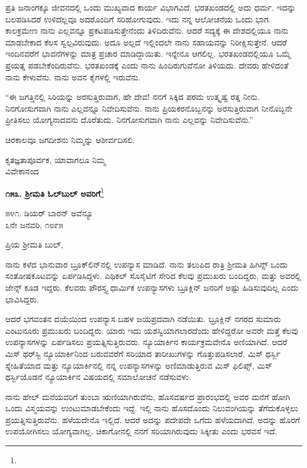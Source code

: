 ಪ್ರತಿ ಜನಾಂಗಕ್ಕೂ ಜೀವನದಲ್ಲಿ ಒಂದು ಮುಖ್ಯವಾದ ಕಾರ್ಯ ವಿಭಾಗವಿದೆ. ಭರತಖಂಡದಲ್ಲಿ ಅದು ಧರ್ಮ. ಇದನ್ನು ಬಲಪಡಿಸಿದರೆ ಉಳಿದೆಲ್ಲವೂ ಅದರೊಂದಿಗೆ ಸರಿಹೋಗುವುದು. ಇದು ನನ್ನ ಆಲೋಚನೆಯ ಒಂದು ಭಾಗ. ಕಾಲಕ್ರಮೇಣ ನಾನು ಎಲ್ಲವನ್ನೂ ಪ್ರಕಟಪಡಿಸುತ್ತೇನೆಂದು ತಿಳಿದಿರುವೆನು. ಆದರೆ ಸದ್ಯಕ್ಕೆ ಈ ದೇಶದಲ್ಲಿಯೂ ನಾನು ಮಾಡಬೇಕಾದ ಕೆಲಸ ಸ್ವಲ್ಪವಿರುವುದು. ಅದೂ ಅಲ್ಲದೆ ಇಲ್ಲಿಂದಲೇ ನಾನು ಸಹಾಯವನ್ನು ನಿರೀಕ್ಷಿಸುತ್ತೇನೆ. ಆದರೆ ಇಂದಿನವರೆಗೆ ಭಾವನೆಗಳನ್ನು ಮಾತ್ರ ಪ್ರಚಾರ ಮಾಡಿದ್ದಾಯಿತು. ಇನ್ನೇನೂ ಆಗಲಿಲ್ಲ. ಭರತಖಂಡದಲ್ಲಿಯೂ ಒಮ್ಮೆ ಪ್ರಯತ್ನ ಪಡಬೇಕೆಂದಿರುವೆನು. ಭರತಖಂಡಕ್ಕೆ ಎಂದು ನಾನು ಹಿಂದಿರುಗುವೆನೋ ತಿಳಿಯದು. ದೇವರು ಹೇಳಿದಂತೆ ನಾನು ಕೇಳುವೆನು. ನಾನು ಅವನ ಕೈಗಳಲ್ಲಿ ಇರುವೆನು.

“ಈ ಜಗತ್ತಿನಲ್ಲಿ ಸಿರಿಯನ್ನು ಅರಸುತ್ತಿರುವಾಗ, ಹೇ ದೇವ! ನನಗೆ ಸಿಕ್ಕಿದ ಪರಮ ಉತ್ಕೃಷ್ಟ ರತ್ನ ನೀನು. ನಿನಗೋಸುಗವಾಗಿ ನಾನು ಎಲ್ಲವನ್ನೂ ನಿವೇದಿಸುವೆನು. ನಾನು ಪ್ರಿಯಕರನೊಬ್ಬನನ್ನು ಅರಸುತ್ತಿರುವಾಗ ನೀನೊಬ್ಬನೇ ಪ್ರೀತಿಸಲು ಯೋಗ್ಯನಾದವನು ದೊರೆತುದು. ನಿನಗೋಸುಗವಾಗಿ ನಾನು ಎಲ್ಲವನ್ನು ನಿವೇದಿಸುವೆನು.”

ಚಿರಕಾಲವೂ ಜಗದೀಶನು ನಿಮ್ಮನ್ನು ಆಶೀರ್ವದಿಸಲಿ.

{\flushright
ಕೃತಜ್ಞತಾಪೂರ್ವಕ, ಯಾವಾಗಲೂ ನಿಮ್ಮ\\ವಿವೇಕಾನಂದ\par}

\begin{center}
\textbf{೧೫೩. ಶ‍್ರೀಮತಿ ಓಲ್‌ಬುಲ್‌ ಅವರಿಗೆ}\footnote{}
\end{center}

\begin{flushright}
೫೪೧. ಡಿಯರ್ ಬಾರನ್ ಅವೆನ್ಯೂ\\೩ನೇ ಜನವರಿ, ೧೮೯೫
\end{flushright}

\noindent
ಪ್ರಿಯ ಶ‍್ರೀಮತಿ ಬುಲ್,

ನಾನು ಕಳೆದ ಭಾನುವಾರ ಬ್ರೂಕ್‌ಲಿನ್‌ನಲ್ಲಿ ಉಪನ್ಯಾಸ ಮಾಡಿದೆ. ನಾನು ತಲುಪಿದ ರಾತ್ರಿ ಶ‍್ರೀಮತಿ ಹಿಗಿನ್ಸ್ ಒಂದು ಸಂತೋಷಕೂಟವನ್ನು ಏರ್ಪಡಿಸಿದ್ದಳು. ಎಥಿಕಲ್ ಸೊಸೈಟಿಗೆ ಸೇರಿದ ಕೆಲವು ಪ್ರಮುಖರು ಬಂದಿದ್ದರು, ಮತ್ತು ಅವರಲ್ಲಿ ಜೇನ್ಸ್ ಕೂಡ ಇದ್ದರು. ಕೆಲವರು ಪೌರಸ್ತ್ಯ ಧಾರ್ಮಿಕ ಉಪನ್ಯಾಸಗಳು ಬ್ರೂಕ್ಲಿನ್ ಜನರಿಗೆ ಅಷ್ಟು ಹಿಡಿಸುವುದಿಲ್ಲ ಎಂದು ಭಾವಿಸಿದ್ದರು.

ಆದರೆ ಭಗವಂತನ ದಯೆಯಿಂದ ಉಪನ್ಯಾಸ ಬಹಳ ಜಯಪ್ರದವಾಗಿ ನಡೆಯಿತು. ಬ್ರೂಕ್ಲಿನ್ ನಗರದ ಸುಮಾರು ಎಂಟುನೂರು ಪ್ರಮುಖರು ಬಂದಿದ್ದರು. ಯಾರು ಇದು ಯಶಸ್ವಿಯಾಗಲಾರದೆಂದು ಹೇಳಿದ್ದರೋ ಅವರೇ ಮತ್ತೆ ಕೆಲವು ಉಪನ್ಯಾಸಗಳನ್ನು ಏರ್ಪಡಿಸಲು ಪ್ರಯತ್ನಿಸುತ್ತಿರುವರು. ನ್ಯೂಯಾರ್ಕಿನ ಕಾರ್ಯಕ್ರಮವೇನೊ ಅಣಿಯಾಗಿದೆ. ಆದರೆ ಮಿಸ್ ಥರ್‌ಸ್ಬಿ ನ್ಯೂಯಾರ್ಕಿನಿಂದ ಬರುವವರೆಗೆ ಸರಿಯಾದ ತಾರೀಖುಗಳನ್ನು ಗೊತ್ತುಪಡಿಸಲಾರೆ. ಮಿಸ್ ಥರ್ಸ್ಬಿ ಸ್ನೇಹಿತೆಯಾದ ಮತ್ತು ನ್ಯೂಯಾರ್ಕಿನಲ್ಲಿ ನನ್ನ ಉಪನ್ಯಾಸಗಳನ್ನು ಅಣಿಮಾಡುತ್ತಿರುವ ಮಿಸ್ ಫಿಲಿಪ್ಸ್, ಮಿಸ್ ಥರ್ಸ್ಬಿಯೊಡನೆ ನ್ಯೂಯಾರ್ಕಿನ ವಿಷಯದಲ್ಲಿ ಸಮಾಲೋಚನೆ ನಡೆಸುವಳು.

ನಾನು ಹೇಲ್ ಮನೆಯವರಿಗೆ ತುಂಬಾ ಋಣಿಯಾಗಿರುವೆನು, ಹೊಸವರ್ಷದ ಪ್ರಾರಂಭದಲ್ಲಿ ಅವರ ಮನೆಗೆ ಹೋಗಿ ಒಂದು ವಿಸ್ಮಯವನ್ನು ಉಂಟುಮಾಡಬೇಕೆಂದು ಇದ್ದೆ. ಇಲ್ಲಿ ನಾನು ಹೊಸದೊಂದು ನಿಲುವಂಗಿಯನ್ನು ತೆಗೆದುಕೊಳ್ಳಲು ಪ್ರಯತ್ನಿಸುತ್ತಿರುವೆನು. ಹಳೆಯದೇನೊ ಇಲ್ಲಿದೆ. ಆದರೆ ಅದನ್ನು ಪದೇಪದೇ ಒಗೆದು ಹಳೆಯದಾಗಿದೆ. ಅದನ್ನು ಹೊರಗೆ ಉಪಯೋಗಿಸಲು ಯೋಗ್ಯವಾಗಿಲ್ಲ. ಚಿಕಾಗೋನಲ್ಲಿ ನನಗೆ ಸರಿಯಾಗಿರುವುದು ಸಿಕ್ಕೀತು ಎಂದು ಭರವಸೆ ಇದೆ.

